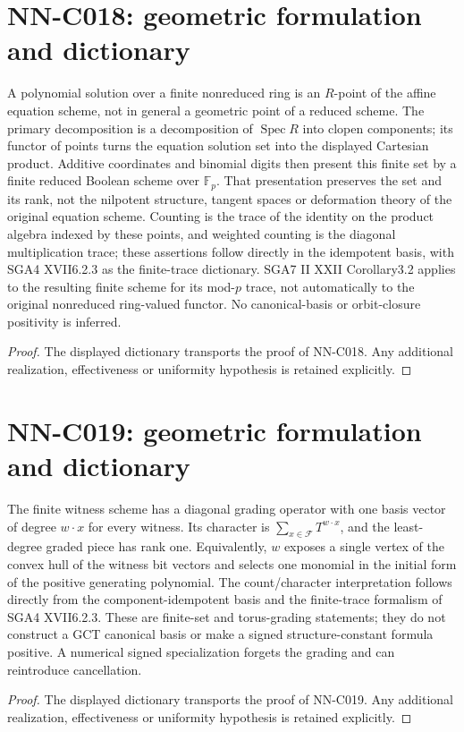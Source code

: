 \section{NN-C018: geometric formulation and dictionary}
\begin{geometricstatement}[NN-C018]
A polynomial solution over a finite nonreduced ring is an $R$-point of the affine equation scheme, not in general a geometric point of a reduced scheme. The primary decomposition is a decomposition of $\operatorname{Spec}R$ into clopen components; its functor of points turns the equation solution set into the displayed Cartesian product. Additive coordinates and binomial digits then present this finite set by a finite reduced Boolean scheme over $\mathbb F_p$. That presentation preserves the set and its rank, not the nilpotent structure, tangent spaces or deformation theory of the original equation scheme. Counting is the trace of the identity on the product algebra indexed by these points, and weighted counting is the diagonal multiplication trace; these assertions follow directly in the idempotent basis, with SGA4 XVII6.2.3 as the finite-trace dictionary. SGA7 II XXII Corollary3.2 applies to the resulting finite scheme for its mod-$p$ trace, not automatically to the original nonreduced ring-valued functor. No canonical-basis or orbit-closure positivity is inferred.
\end{geometricstatement}
\begin{proof} The displayed dictionary transports the proof of NN-C018. Any additional realization, effectiveness or uniformity hypothesis is retained explicitly.\end{proof}


\section{NN-C019: geometric formulation and dictionary}
\begin{geometricstatement}[NN-C019]
The finite witness scheme has a diagonal grading operator with one basis vector of degree $w\cdot x$ for every witness. Its character is $\sum_{x\in\mathcal F}T^{w\cdot x}$, and the least-degree graded piece has rank one. Equivalently, $w$ exposes a single vertex of the convex hull of the witness bit vectors and selects one monomial in the initial form of the positive generating polynomial. The count/character interpretation follows directly from the component-idempotent basis and the finite-trace formalism of SGA4 XVII6.2.3. These are finite-set and torus-grading statements; they do not construct a GCT canonical basis or make a signed structure-constant formula positive. A numerical signed specialization forgets the grading and can reintroduce cancellation.
\end{geometricstatement}
\begin{proof} The displayed dictionary transports the proof of NN-C019. Any additional realization, effectiveness or uniformity hypothesis is retained explicitly.\end{proof}


